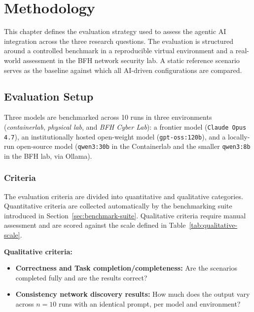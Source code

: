 
\chapter{Methodology}\label{ch:methodology}

This chapter defines the evaluation strategy used to assess the agentic \gls{AI} integration across the three research questions.
The evaluation is structured around a controlled benchmark in a reproducible virtual environment and a real-world assessment in the BFH network security lab.
A static reference scenario serves as the baseline against which all \gls{AI}-driven configurations are compared.


\section{Evaluation Setup}\label{sec:evaluation-setup}

Three models are benchmarked across 10 runs in three environments (\emph{containerlab}, \emph{physical lab}, and \emph{BFH Cyber Lab}):
a frontier model (\texttt{Claude Opus 4.7}),
an institutionally hosted open-weight model (\texttt{gpt-oss:120b}),
and a locally-run open-source model (\texttt{qwen3:30b} in the Containerlab and the smaller \texttt{qwen3:8b} in the BFH lab, via Ollama).

\subsection{Criteria}\label{subsec:criteria}

The evaluation criteria are divided into quantitative and qualitative categories.
Quantitative criteria are collected automatically by the benchmarking suite introduced in Section~\ref{sec:benchmark-suite}.
Qualitative criteria require manual assessment and are scored against the scale defined in Table~\ref{tab:qualitative-scale}.

\textbf{Qualitative criteria:}

\begin{itemize}
    \item \textbf{Correctness and Task completion/completeness:} Are the scenarios completed fully and are the results correct?
    \item \textbf{Consistency network discovery results:} How much does the output vary across $n = 10$ runs with an identical prompt, per model and environment?
\end{itemize}

